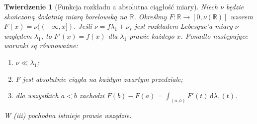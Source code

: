 \documentclass[11pt,a4paper,oneside]{book}
\numberwithin{equation}{chapter}
\theoremstyle{plain}
\newtheorem{twierdzenie}{Twierdzenie}[chapter]
\theoremstyle{definition}
\theoremstyle{remark}
\begin{document}
\begin{twierdzenie}[Funkcja rozkładu a absolutna ciągłość miary]
\label{thm:cdf-derivative-25}
Niech $\nu$ będzie skończoną dodatnią miarą borelowską
na $\mathbb R$. Określmy $F:\mathbb R\to[0,\nu(\mathbb R)]$
wzorem $F(x)=\nu(( -\infty,x])$.
Jeśli $\nu=f\lambda_1+\nu_s$ jest rozkładem Lebesgue'a
miary $\nu$ względem $\lambda_1$, to
$F'(x)=f(x)$ dla $\lambda_1$-prawie każdego $x$.
Ponadto następujące warunki są równoważne:
\begin{enumerate}[label=(\roman*)]
\item $\nu\ll\lambda_1$;
\item $F$ jest absolutnie ciągła na każdym zwartym
przedziale;
\item dla wszystkich $a<b$ zachodzi
$F(b)-F(a)=\int_{(a,b)}F'(t)\,\mathrm d\lambda_1(t)$.
\end{enumerate}
W (iii) pochodna istnieje prawie wszędzie.
\end{twierdzenie}
\end{document}
